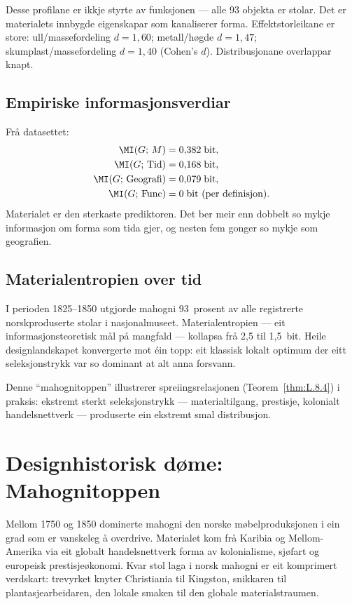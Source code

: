 Desse profilane er ikkje styrte av funksjonen --- alle 93 objekta
er stolar. Det er materialets innbygde eigenskapar som kanaliserer
forma. Effektstorleikane er store: ull/massefordeling $d = 1{,}60$;
metall/høgde $d = 1{,}47$; skumplast/massefordeling $d = 1{,}40$
(Cohen's $d$). Distribusjonane overlappar knapt.

\subsection{Empiriske informasjonsverdiar}

Frå datasettet:
\begin{align*}
  \MI(G;\, M) &= 0{,}382 \;\text{bit}, \\
  \MI(G;\, \mathrm{Tid}) &= 0{,}168 \;\text{bit}, \\
  \MI(G;\, \mathrm{Geografi}) &= 0{,}079 \;\text{bit}, \\
  \MI(G;\, \mathrm{Func}) &= 0 \;\text{bit (per definisjon).}
\end{align*}
Materialet er den sterkaste prediktoren. Det ber meir enn dobbelt
so mykje informasjon om forma som tida gjer, og nesten fem gonger
so mykje som geografien.

\subsection{Materialentropien over tid}

I perioden 1825--1850 utgjorde mahogni 93~prosent av alle
registrerte norskproduserte stolar i nasjonalmuseet. Material\-entropien --- eit informasjonsteoretisk mål på mangfald --- kollapsa
frå 2{,}5 til 1{,}5~bit. Heile designlandskapet konvergerte mot
éin topp: eit klassisk lokalt optimum der eitt seleksjonstrykk var
so dominant at alt anna forsvann.

Denne ``mahognitoppen'' illustrerer spreiingsrelasjonen
(Teorem~\ref{thm:L.8.4}) i praksis: ekstremt sterkt
seleksjonstrykk --- materialtilgang, prestisje, kolonialt
handelsnettverk --- produserte ein ekstremt smal distribusjon.


\section{Designhistorisk døme: Mahognitoppen}

Mellom 1750 og 1850 dominerte mahogni den norske møbelproduksjonen
i ein grad som er vanskeleg å overdrive. Materialet kom frå
Karibia og Mellom-Amerika via eit globalt handelsnettverk forma av
kolonialisme, sjøfart og europeisk prestisjeøkonomi. Kvar stol
laga i norsk mahogni er eit komprimert verdskart: trevyrket
knyter Christiania til Kingston, snikkaren til plantasjearbeidaren,
den lokale smaken til den globale materialstraumen.

